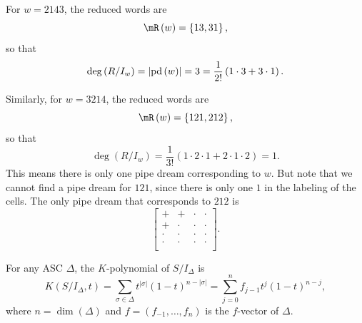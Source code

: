 \documentclass[co439]{subfiles}
\begin{document}
    \begin{example}{}
        For $w=2143$, the reduced words are
        \begin{equation*}
            \mR\left( w \right) = \left\lbrace 13,31 \right\rbrace,
        \end{equation*}
        so that
        \begin{equation*}
            \deg\left( R /I_w \right) = \left| \operatorname{pd}\left( w \right) \right| = 3 = \frac{1}{2!} \left( 1\cdot 3 + 3\cdot 1 \right).
        \end{equation*}

        Similarly, for $w=3214$, the reduced words are
        \begin{equation*}
            \mR\left( w \right) = \left\lbrace 121, 212 \right\rbrace,
        \end{equation*}
        so that
        \begin{equation*}
            \deg\left( R /I_w \right) = \frac{1}{3!} \left( 1\cdot 2\cdot 1 + 2\cdot 1\cdot 2 \right) = 1.
        \end{equation*}
        This means there is only one pipe dream corresponding to $w$. But note that we cannot find a pipe dream for $121$, since there is only one $1$ in the labeling of the cells. The only pipe dream that corresponds to $212$ is
        \begin{equation*}
            \begin{bmatrix}
            	+ & + & \cdot & \cdot \\
            	+ & \cdot & \cdot & \cdot \\
            	\cdot & \cdot & \cdot & \cdot \\
            	\cdot & \cdot & \cdot & \cdot \\
            \end{bmatrix}.
        \end{equation*}
    \end{example}

    \rruleline
    
    \begin{theorem}{}
        For any ASC $\Delta$, the $K$-polynomial of $S /I_{\Delta}$ is
        \begin{equation*}
            K\left( S /I_{\Delta}, t \right) = \sum^{}_{\sigma\in\Delta} t^{\left| \sigma \right|}\left( 1-t \right)^{n-\left| \sigma \right|} = \sum^{n}_{j=0} f_{j-1}t^j\left( 1-t \right)^{n-j},
        \end{equation*}
        where $n=\dim\left( \Delta \right)$ and  $f=\left( f_{-1},\ldots,f_n \right)$ is the $f$-vector of $\Delta$.
    \end{theorem}
\end{document}
